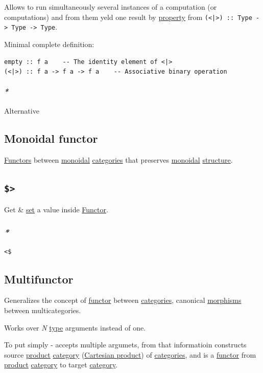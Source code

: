 \documentclass[a4paper,14pt,oneside]{book}
\begin{document}
Allows to run simultaneously several instances of a computation (or computations) and from them yeld one result by \hyperref[orgb96cce5]{property} from \texttt{(<|>) :: Type -> Type -> Type}.

Minimal complete definition:
\begin{verbatim}
empty :: f a    -- The identity element of <|>
(<|>) :: f a -> f a -> f a    -- Associative binary operation
\end{verbatim}

\paragraph{\emph{*}}
\label{sec:org7d276fe}

\label{orgeb027e4}Alternative

\subsection{\label{org350e6a6}Monoidal functor}
\label{sec:orgc66b450}
\hyperref[org880fb2b]{Functors} between \hyperref[orgbb05502]{monoidal} \hyperref[org69d7ddf]{categories} that preserves \hyperref[orgbb05502]{monoidal} \hyperref[org750a3dd]{structure}.

\subsection{\texttt{\$>}}
\label{sec:org8401549}
Get \& \hyperref[org8140fe5]{set} a value inside \hyperref[org41edcd3]{Functor}.

\subsubsection{\emph{*}}
\label{sec:org1fb5d5d}

\texttt{<\$}

\subsection{\label{org1680a17}Multifunctor}
\label{sec:org9eca51d}
Generalizes the concept of \hyperref[org41edcd3]{functor} between \hyperref[org69d7ddf]{categories}, canonical \hyperref[orgd74c740]{morphisms} between multicategories.

Works over \emph{N} \hyperref[org02a9d3a]{type} arguments instead of one.

To put simply - accepts multiple argumets, from that informatioin constructs source \hyperref[org031d37b]{product} \hyperref[org77a2b71]{category} (\hyperref[orgdb0441e]{Cartesian product}) of \hyperref[org69d7ddf]{categories}, and is a \hyperref[org41edcd3]{functor} from \hyperref[org031d37b]{product} \hyperref[org77a2b71]{category} to target \hyperref[org77a2b71]{category}.
\end{document}
